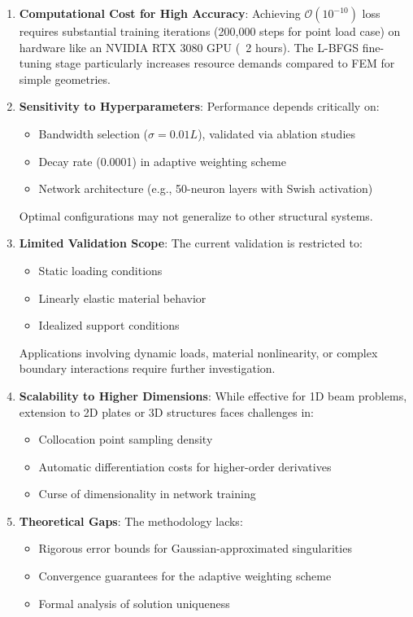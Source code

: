 \documentclass[12pt]{article}
\begin{document}
\begin{enumerate}
	\item \textbf{Computational Cost for High Accuracy}: Achieving $\mathcal{O}(10^{-10})$ loss requires substantial training iterations (200,000 steps for point load case) on hardware like an NVIDIA RTX 3080 GPU (~2 hours). The L-BFGS fine-tuning stage particularly increases resource demands compared to FEM for simple geometries.

	\item \textbf{Sensitivity to Hyperparameters}: Performance depends critically on:
	\begin{itemize}
		\item Bandwidth selection ($\sigma=0.01L$), validated via ablation studies
		\item Decay rate (0.0001) in adaptive weighting scheme
		\item Network architecture (e.g., 50-neuron layers with Swish activation)
	\end{itemize}
	Optimal configurations may not generalize to other structural systems.

	\item \textbf{Limited Validation Scope}: The current validation is restricted to:
	\begin{itemize}
		\item Static loading conditions
		\item Linearly elastic material behavior
		\item Idealized support conditions
	\end{itemize}
	Applications involving dynamic loads, material nonlinearity, or complex boundary interactions require further investigation.

	\item \textbf{Scalability to Higher Dimensions}: While effective for 1D beam problems, extension to 2D plates or 3D structures faces challenges in:
	\begin{itemize}
		\item Collocation point sampling density
		\item Automatic differentiation costs for higher-order derivatives
		\item Curse of dimensionality in network training
	\end{itemize}

	\item \textbf{Theoretical Gaps}: The methodology lacks:
	\begin{itemize}
		\item Rigorous error bounds for Gaussian-approximated singularities
		\item Convergence guarantees for the adaptive weighting scheme
		\item Formal analysis of solution uniqueness
	\end{itemize}


\end{enumerate}
\end{document}
